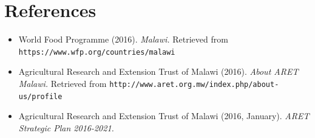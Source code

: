\documentclass[12pt,letterpaper]{article}
\begin{document}
\clearpage
\section{References}
\begin{flushleft}
\begin{itemize}[leftmargin=12pt]

\item World Food Programme (2016). \emph{Malawi.}
 Retrieved from \texttt{https://www.wfp.org/countries/malawi}

\item Agricultural Research and Extension Trust of Malawi (2016). \emph{About ARET Malawi.}
Retrieved from \texttt{http://www.aret.org.mw/index.php/about-us/profile}

\item Agricultural Research and Extension Trust of Malawi (2016, January). \emph{ARET Strategic Plan 2016-2021.}


\end{itemize}
\end{flushleft}   
\end{document}
